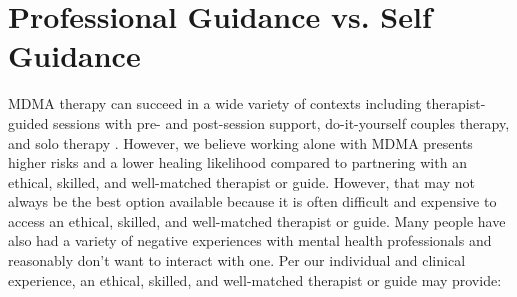 \documentclass[12pt,letterpaper]{book}
\begin{document}
\section{Professional Guidance vs. Self Guidance}
\label{professionalVSSelf}
MDMA therapy can succeed in a wide variety of contexts including therapist-guided sessions with pre- and post-session support, do-it-yourself couples therapy, and solo therapy \cite{mitchellMDMAClinicalTrial2,colbertEvenings,hillsSolo}. However, we believe working alone with MDMA presents higher risks and a lower healing likelihood compared to partnering with an ethical, skilled, and well-matched therapist or guide. However, that may not always be the best option available because it is often difficult and expensive to access an ethical, skilled, and well-matched therapist or guide. Many people have also had a variety of negative experiences with mental health professionals and reasonably don't want to interact with one. Per our individual and clinical experience, an ethical, skilled, and well-matched therapist or guide may provide:
\end{document}
